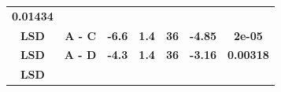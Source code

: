 \documentclass[]{book}
\theoremstyle{definition}
\theoremstyle{definition}
\theoremstyle{definition}
\theoremstyle{remark}
\begin{document}
\begin{longtable}[]{@{}ccccccc@{}}
\begin{minipage}[t]{0.13\columnwidth}
\textbf{0.01434}\strut
\end{minipage}\tabularnewline
\begin{minipage}[t]{0.16\columnwidth}\centering
\textbf{LSD}\strut
\end{minipage} & \begin{minipage}[t]{0.12\columnwidth}\centering
\textbf{A - C}\strut
\end{minipage} & \begin{minipage}[t]{0.11\columnwidth}\centering
\textbf{-6.6}\strut
\end{minipage} & \begin{minipage}[t]{0.10\columnwidth}\centering
\textbf{1.4}\strut
\end{minipage} & \begin{minipage}[t]{0.09\columnwidth}\centering
\textbf{36}\strut
\end{minipage} & \begin{minipage}[t]{0.12\columnwidth}\centering
\textbf{-4.85}\strut
\end{minipage} & \begin{minipage}[t]{0.13\columnwidth}\centering
\textbf{2e-05}\strut
\end{minipage}\tabularnewline
\begin{minipage}[t]{0.16\columnwidth}\centering
\textbf{LSD}\strut
\end{minipage} & \begin{minipage}[t]{0.12\columnwidth}\centering
\textbf{A - D}\strut
\end{minipage} & \begin{minipage}[t]{0.11\columnwidth}\centering
\textbf{-4.3}\strut
\end{minipage} & \begin{minipage}[t]{0.10\columnwidth}\centering
\textbf{1.4}\strut
\end{minipage} & \begin{minipage}[t]{0.09\columnwidth}\centering
\textbf{36}\strut
\end{minipage} & \begin{minipage}[t]{0.12\columnwidth}\centering
\textbf{-3.16}\strut
\end{minipage} & \begin{minipage}[t]{0.13\columnwidth}\centering
\textbf{0.00318}\strut
\end{minipage}\tabularnewline
\begin{minipage}[t]{0.16\columnwidth}\centering
\textbf{LSD}\strut
\end{minipage} & \begin{minipage}[t]{0.12\columnwidth}\centering

\end{minipage}
\end{longtable}
\end{document}
